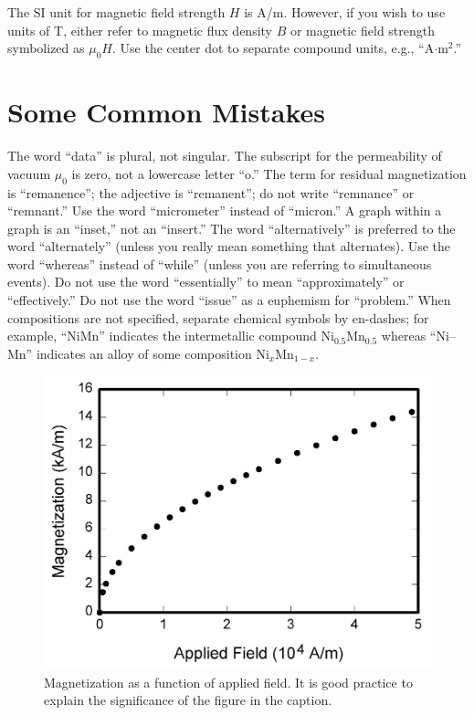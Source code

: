 \documentclass[journal,twoside,web]{ieeecolor}
\begin{document}
The SI unit for magnetic field strength $H$ is A/m. However, if you wish to use 
units of T, either refer to magnetic flux density $B$ or magnetic field 
strength symbolized as $\mu _{0}H$. Use the center dot to separate 
compound units, e.g., ``A$\cdot $m$^{2}$.''

\section{Some Common Mistakes}
The word ``data'' is plural, not singular. The subscript for the 
permeability of vacuum $\mu _{0}$ is zero, not a lowercase letter 
``o.'' The term for residual magnetization is ``remanence''; the adjective 
is ``remanent''; do not write ``remnance'' or ``remnant.'' Use the word 
``micrometer'' instead of ``micron.'' A graph within a graph is an 
``inset,'' not an ``insert.'' The word ``alternatively'' is preferred to the 
word ``alternately'' (unless you really mean something that alternates). Use 
the word ``whereas'' instead of ``while'' (unless you are referring to 
simultaneous events). Do not use the word ``essentially'' to mean 
``approximately'' or ``effectively.'' Do not use the word ``issue'' as a 
euphemism for ``problem.'' When compositions are not specified, separate 
chemical symbols by en-dashes; for example, ``NiMn'' indicates the 
intermetallic compound Ni$_{0.5}$Mn$_{0.5}$ whereas 
``Ni--Mn'' indicates an alloy of some composition 
Ni$_{x}$Mn$_{1-x}$.

\begin{figure}[!t]
\centerline{\includegraphics[width=\columnwidth]{fig1.png}}
\caption{Magnetization as a function of applied field.
It is good practice to explain the significance of the figure in the caption.}
\label{fig1}
\end{figure}
\end{document}
